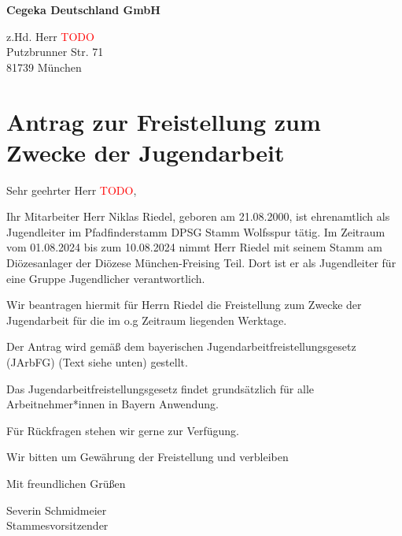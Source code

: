 \newcommand{\TODO}{\textcolor{red}{TODO}}

\textbf{Cegeka Deutschland GmbH}

z.Hd. Herr \TODO\\
Putzbrunner Str. 71\\
81739 München

\section*{Antrag zur Freistellung zum Zwecke der Jugendarbeit}
 
Sehr geehrter Herr \TODO, 


Ihr Mitarbeiter Herr Niklas Riedel, geboren am 21.08.2000, ist ehrenamtlich als Jugendleiter im Pfadfinderstamm DPSG Stamm Wolfsspur tätig. Im Zeitraum vom 01.08.2024 bis zum 10.08.2024 nimmt Herr Riedel mit seinem Stamm am Diözesanlager der Diözese München-Freising Teil. Dort ist er als Jugendleiter für eine Gruppe Jugendlicher verantwortlich.


Wir beantragen hiermit für Herrn Riedel die Freistellung zum Zwecke der Jugendarbeit für die im o.g Zeitraum liegenden Werktage.

Der Antrag wird gemäß dem bayerischen Jugendarbeitfreistellungsgesetz (JArbFG) (Text siehe unten) gestellt. 

Das Jugendarbeitfreistellungsgesetz findet grundsätzlich für alle Arbeitnehmer*innen in Bayern Anwendung. 



Für Rückfragen stehen wir gerne zur Verfügung. 



Wir bitten um Gewährung der Freistellung 
und verbleiben 



Mit freundlichen Grüßen 

Severin Schmidmeier\\
Stammesvorsitzender
